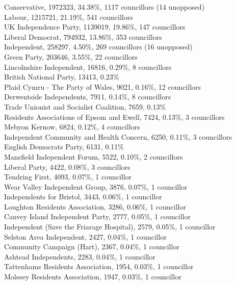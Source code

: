 \documentclass[a4paper,openany,10pt]{book}
\begin{document}
Conservative, 1972323, 34.38\%, 1117 councillors (14 unopposed)\\
Labour, 1215721, 21.19\%, 541 councillors\\
UK Independence Party, 1139019, 19.86\%, 147 councillors\\
Liberal Democrat, 794932, 13.86\%, 353 councillors\\
Independent, 258297, 4.50\%, 269 councillors (16 unopposed)\\
Green Party, 203646, 3.55\%, 22 councillors\\
Lincolnshire Independent, 16816, 0.29\%, 8 councillors\\
British National Party, 13413, 0.23\% \\
Plaid Cymru - The Party of Wales, 9021, 0.16\%, 12 councillors\\
Derwentside Independents, 7911, 0.14\%, 8 councillors\\
Trade Unionist and Socialist Coalition, 7659, 0.13\% \\
Residents Associations of Epsom and Ewell, 7424, 0.13\%, 3 councillors\\
Mebyon Kernow, 6824, 0.12\%, 4 councillors\\
Independent Community and Health Concern, 6250, 0.11\%, 3 councillors\\
English Democrats Party, 6131, 0.11\% \\
Mansfield Independent Forum, 5522, 0.10\%, 2 councillors\\
Liberal Party, 4422, 0.08\%, 3 councillors\\
Tendring First, 4093, 0.07\%, 1 councillor\\
Wear Valley Independent Group, 3876, 0.07\%, 1 councillor\\
Independents for Bristol, 3443, 0.06\%, 1 councillor\\
Loughton Residents Association, 3286, 0.06\%, 1 councillor\\
Canvey Island Independent Party, 2777, 0.05\%, 1 councillor\\
Independent (Save the Friarage Hospital), 2579, 0.05\%, 1 councillor\\
Selston Area Independent, 2427, 0.04\%, 1 councillor\\
Community Campaign (Hart), 2367, 0.04\%, 1 councillor\\
Ashtead Independents, 2283, 0.04\%, 1 councillor\\
Tattenhams Residents Association, 1954, 0.03\%, 1 councillor\\
Molesey Residents Association, 1947, 0.03\%, 1 councillor\\
\end{document}
